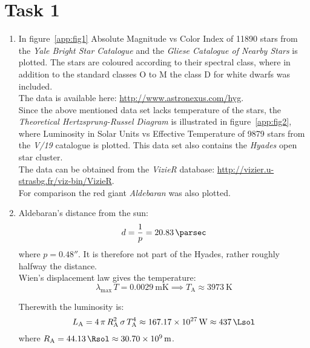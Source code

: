 \documentclass[11pt,a4paper]{scrartcl}
\newcommand{\La}{\ensuremath{L_{\textrm{A}}}}
\newcommand{\Ta}{\ensuremath{T_{\textrm{A}}}}
\newcommand{\Ra}{\ensuremath{R_{\textrm{A}}}}
\begin{document}
\section*{Task 1}

\begin{enumerate}[label=\textbf{\large(\alph*)}, itemsep=2\baselineskip]

\item
    In figure~\ref{app:fig1} Absolute Magnitude vs Color Index of \num{11890}
    stars from the \emph{Yale Bright Star Catalogue} and the
    \emph{Gliese Catalogue of Nearby Stars} is plotted. The stars are coloured
    according to their spectral class, where in addition to the standard
    classes O to M the class D for white dwarfs was included. \\
    The data is available here: \url{http://www.astronexus.com/hyg}. \\

    Since the above mentioned data set lacks temperature of the stars, the
    \emph{Theoretical Hertzsprung-Russel Diagram} is illustrated in
    figure~\ref{app:fig2}, where Luminosity in Solar Units vs Effective
    Temperature of \num{9879} stars from the \emph{V/19} catalogue is plotted.
    This data set also contains the \emph{Hyades} open star cluster. \\
    The data can be obtained from the \emph{VizieR} database:
    \url{http://vizier.u-strasbg.fr/viz-bin/VizieR}. \\
    For comparison the red giant \emph{Aldebaran} was also plotted.

\item
    Aldebaran's distance from the sun:
    \begin{equation*}
        d=\frac{1}{p}=\SI{20.83}{\parsec}
    \end{equation*}
    where $p=0.48''$.
    It is therefore not part of the Hyades, rather roughly halfway the
    distance. \\

    Wien's displacement law gives the temperature:
    \begin{equation*}
    \lambda_{\textrm{max}}\,T=\SI{0.0029}{\metre\kelvin}\implies
    \Ta\approx\SI{3973}{\kelvin}
    \end{equation*}

    Therewith the luminosity is:
    \begin{equation*}
        \La = 4\,\pi\,\Ra^2\,\sigma\,\Ta^4 \approx \SI{167.17e27}{\watt} \approx
        \SI{437}{\Lsol}
    \end{equation*}
    where $\Ra = \SI{44.13}{\Rsol}\approx\SI{30.70e9}{\metre}$. \\


\end{enumerate}
\end{document}
